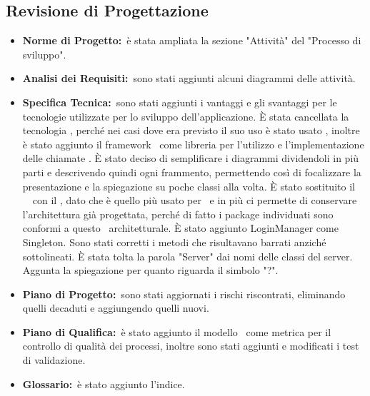 	\subsection{Revisione di Progettazione}
	\label{revisioneDiProgettazione}
		\begin{itemize}
			\item \textbf{Norme di Progetto:}\ è stata ampliata la sezione "Attività" del "Processo di sviluppo".
			\item \textbf{Analisi dei Requisiti:}\ sono stati aggiunti alcuni diagrammi delle attività.
			\item \textbf{Specifica Tecnica:}\ sono stati aggiunti i vantaggi e gli svantaggi per le tecnologie utilizzate per lo sviluppo dell'applicazione. È stata cancellata la tecnologia , perché nei casi dove era previsto il suo uso è stato usato , inoltre è stato aggiunto il framework \ come libreria per l'utilizzo e l'implementazione delle chiamate . È stato deciso di semplificare i diagrammi dividendoli in più parti e descrivendo quindi ogni frammento, permettendo così di focalizzare la presentazione e la spiegazione su poche classi alla volta. È stato sostituito il \ \ con il , dato che è quello più usato per \ e in più ci permette di conservare l'architettura già progettata, perché di fatto i package individuati sono conformi a questo \ architetturale. È stato aggiunto LoginManager come Singleton. Sono stati corretti i metodi che risultavano barrati anziché sottolineati. È stata tolta la parola "Server" dai nomi delle classi del server. Aggunta la spiegazione per quanto riguarda il simbolo "?".
			\item \textbf{Piano di Progetto:}\ sono stati aggiornati i rischi riscontrati, eliminando quelli decaduti e aggiungendo quelli nuovi.
			\item \textbf{Piano di Qualifica:}\ è stato aggiunto il modello \ come metrica per il controllo di qualità dei processi, inoltre sono stati aggiunti e modificati i test di validazione.
			\item \textbf{Glossario:}\ è stato aggiunto l'indice.
		\end{itemize}
		
